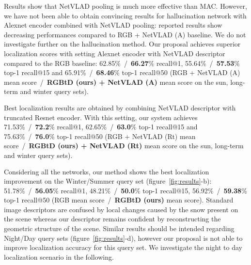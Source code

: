 Results show that NetVLAD pooling is much more effective than MAC. However, we have not been able to obtain convincing results for hallucination network with Alexnet encoder combined with NetVLAD pooling: reported results show decreasing performances compared to RGB + NetVLAD (A) baseline. We do not investigate further on the hallucination method. Our proposal achieves superior localization scores with setting Alexnet encoder with NetVLAD descriptor compared to the RGB baseline: 62.85\%~/~\textbf{66.27}\% recall@1, 55.64\%~/~\textbf{57.53}\% top-1 recall@15 and 65.91\%~/~\textbf{68.46}\% top-1 recall@50  (RGB + NetVLAD (A) mean score~/~\textbf{RGBtD (ours) + NetVLAD (A)} mean score on the sun, long-term and winter query sets).

Best localization results are obtained by combining NetVLAD descriptor with truncated Resnet encoder. With this setting, our system achieves 71.53\%~/~\textbf{72.2}\% recall@1, 62.65\%~/~\textbf{63.0}\% top-1 recall@15 and 75.63\%~/~\textbf{76.0}\% top-1 recall@50  (RGB + NetVLAD (Rt) mean score~/~\textbf{RGBtD (ours) + NetVLAD (Rt)} mean score on the sun, long-term and winter query sets).

Considering all the networks, our method shows the best localization improvement on the Winter/Summer query set (figure~\ref{fig:results}-b): 51.78\%~/~\textbf{56.05}\% recall@1, 48.21\%~/~\textbf{50.0}\% top-1 recall@15, 56.92\%~/~\textbf{59.38}\% top-1 recall@50  (RGB mean score~/~\textbf{RGBtD (ours)} mean score). Standard image descriptors are confused by local changes caused by the snow present on the scene whereas our descriptor remains confident by reconstructing the geometric structure of the scene. Similar results should be intended regarding Night/Day query sets (figure~\ref{fig:results}-d), however our proposal is not able to improve localization accuracy for this query set. We investigate the night to day localization scenario in the following.

